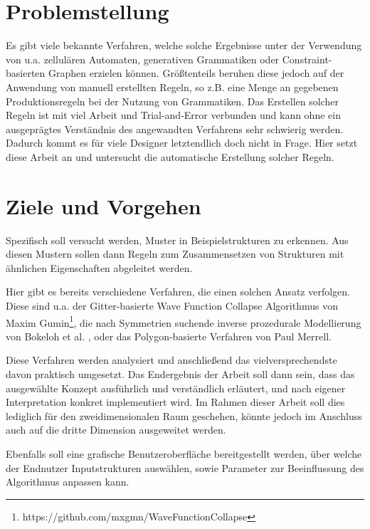 \section{Problemstellung}
Es gibt viele bekannte Verfahren, welche solche Ergebnisse unter der Verwendung von u.a. zellulären Automaten, generativen
Grammatiken oder Constraint-basierten Graphen erzielen können. \cite{5_van_der_linden_et_al} Größtenteils beruhen diese jedoch auf der Anwendung
von manuell erstellten Regeln, so z.B. eine Menge an gegebenen Produktionsregeln bei der Nutzung von Grammatiken. Das Erstellen
solcher Regeln ist mit viel Arbeit und Trial-and-Error verbunden und kann ohne ein ausgeprägtes Verständnis des angewandten Verfahrens
sehr schwierig werden. Dadurch kommt es für viele Designer letztendlich doch nicht in Frage. Hier setzt diese Arbeit an und untersucht
die automatische Erstellung solcher Regeln.

\section{Ziele und Vorgehen}
Spezifisch soll versucht werden, Muster in Beispielstrukturen zu erkennen. Aus diesen Mustern sollen dann Regeln zum Zusammensetzen
von Strukturen mit ähnlichen Eigenschaften abgeleitet werden.

Hier gibt es bereits verschiedene Verfahren, die einen solchen Ansatz verfolgen. Diese sind u.a. der Gitter-basierte Wave Function
Collapse Algorithmus von Maxim Gumin\footnote{https://github.com/mxgmn/WaveFunctionCollapse}, die nach Symmetrien suchende inverse
prozedurale Modellierung von Bokeloh et al. \cite{3_bokeloh_et_al}, oder das Polygon-basierte Verfahren von Paul Merrell.\cite{1_merrell}

Diese Verfahren werden analysiert und anschließend das vielversprechendste davon praktisch umgesetzt. Das Endergebnis der Arbeit
soll dann sein, dass das ausgewählte Konzept ausführlich und verständlich erläutert, und nach eigener Interpretation konkret
implementiert wird. Im Rahmen dieser Arbeit soll dies lediglich für den zweidimensionalen Raum geschehen, könnte jedoch im Anschluss
auch auf die dritte Dimension ausgeweitet werden.

Ebenfalls soll eine grafische Benutzeroberfläche bereitgestellt werden, über welche der Endnutzer Inputstrukturen auswählen, sowie
Parameter zur Beeinflussung des Algorithmus anpassen kann.